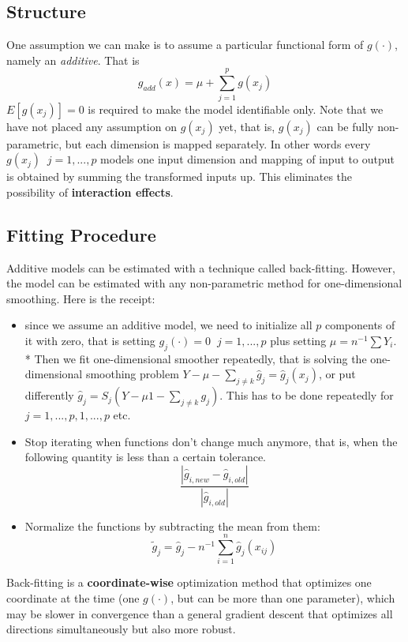\documentclass[]{book}
\providecommand{\tightlist}{%
  \setlength{\itemsep}{0pt}\setlength{\parskip}{0pt}}
\begin{document}
\subsection{Structure}\label{structure}

One assumption we can make is to assume a particular functional form of
\(g(\cdot)\), namely an \emph{additive}. That is
\[g_{add}(x) = \mu + \sum\limits_{j = 1}^pg(x_j) \] \(E[g(x_j)] = 0\) is
required to make the model identifiable only. Note that we have not
placed any assumption on \(g(x_j)\) yet, that is, \(g(x_j)\) can be
fully non-parametric, but each dimension is mapped separately. In other
words every \(g(x_j) \;\; j = 1, ..., p\) models one input dimension and
mapping of input to output is obtained by summing the transformed inputs
up. This eliminates the possibility of \textbf{interaction effects}.

\subsection{Fitting Procedure}\label{fitting-procedure}

Additive models can be estimated with a technique called back-fitting.
However, the model can be estimated with any non-parametric method for
one-dimensional smoothing. Here is the receipt:

\begin{itemize}
\tightlist
\item
  since we assume an additive model, we need to initialize all \(p\)
  components of it with zero, that is setting
  \(g_j(\cdot) = 0 \;\; j = 1,..., p\) plus setting
  \(\mu = n^{-1}\sum Y_i\). * Then we fit one-dimensional smoother
  repeatedly, that is solving the one-dimensional smoothing problem
  \(Y - \mu - \sum\limits_{j \neq k}\hat{g}_j = \hat{g}_j(x_j)\), or put
  differently \(\hat{g}_j = S_j(Y - \mu1 - \sum\limits_{j \neq k}g_j)\).
  This has to be done repeatedly for \(j = 1, ..., p, 1, ..., p\) etc.
\item
  Stop iterating when functions don't change much anymore, that is, when
  the following quantity is less than a certain tolerance.
  \[\frac{|\hat{g}_{i, new} - \hat{g}_{i, old}|}{|\hat{g}_{i, old}|}\]
\item
  Normalize the functions by subtracting the mean from them:
  \[\tilde{g}_j = \hat{g}_j - n^{-1} \sum\limits_{i = 1}^n \hat{g}_j(x_{ij})\]
\end{itemize}

Back-fitting is a \textbf{coordinate-wise} optimization method that
optimizes one coordinate at the time (one \(g(\cdot)\), but can be more
than one parameter), which may be slower in convergence than a general
gradient descent that optimizes all directions simultaneously but also
more robust.
\end{document}
